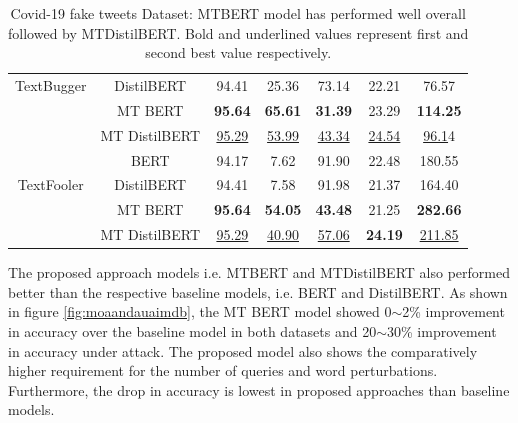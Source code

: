 \documentclass[%
	BCOR=8mm, %
	DIV=12,
	toc=bibliography, %
	toc=listof, %
	oneside, %
	egregdoesnotlikesansseriftitles, %
	]{scrbook}
\begin{document}
\begin{table}[H]
{\begin{tabular}{|c|c|c|c|c|c|c|}
TextBugger & DistilBERT &                94.41 &                    25.36 &                  73.14 &                     22.21 &            76.57 \\
                & MT BERT &               \textbf{ 95.64} &                    \textbf{65.61} &                  \textbf{31.39}&                     23.29 &           \textbf{114.25} \\
                & MT DistilBERT &                \underline{95.29} &                    \underline{53.99} &                  \underline{43.34} &                    \underline{ 24.54} &            \underline{96.1}4 \\
                \midrule
                 & BERT &                94.17 &                     7.62 &                  91.90 &                     22.48 &           180.55 \\
TextFooler & DistilBERT &                94.41 &                     7.58 &                  91.98 &                     21.37 &           164.40 \\
                & MT BERT &                \textbf{95.64} &                   \textbf{ 54.05} &                  \textbf{43.48} &                     21.25 &           \textbf{282.66} \\
                & MT DistilBERT &                \underline{95.29} &                    \underline{40.90} &                 \underline{ 57.06} &                    \textbf{ 24.19} &           \underline{211.85 }\\
            \bottomrule
        \end{tabular}
    }
    \caption[Experiment Result of Covid-19 fake tweets]{Covid-19 fake tweets Dataset: MTBERT model has performed well overall followed by MTDistilBERT. Bold and underlined values represent first and second best value respectively.}
    \label{table:FakeNewsExpRes}
\end{table}
The proposed approach models i.e. MTBERT and MTDistilBERT also performed better than the respective baseline models, i.e. BERT and DistilBERT.  As shown in figure \ref{fig:moaandauaimdb}, the MT BERT model showed 0$\sim$2\% improvement in accuracy over the baseline model in both datasets and 20$\sim$30\% improvement in accuracy under attack. The proposed model also shows the comparatively higher requirement for the number of queries and word perturbations. Furthermore, the drop in accuracy is lowest in proposed approaches than baseline models.
\end{document}
